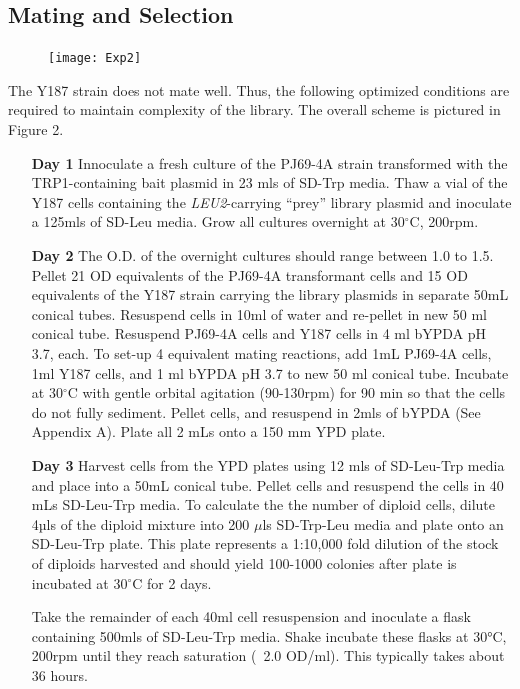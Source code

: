 \documentclass[11pt,fleqn]{book} %
\begin{document}
\subsection{Mating and Selection}

\begin{figure}[!ht]
    \centering
    \texttt{[image: Exp2]}
    \caption{}
    \label{fig:exp_fig2}
\end{figure}

The Y187 strain does not mate well.  Thus, the following optimized conditions are required to maintain complexity of the library.  The overall scheme is pictured in Figure 2.
\vspace{0.1in}
\begin{enumerate}[leftmargin=0.8in]
    \item[\textbf{Day 1}] Innoculate a fresh culture of the PJ69-4A strain transformed with the TRP1-containing bait plasmid in 23 mls of SD-Trp media. Thaw a vial of the Y187 cells containing the \emph{LEU2}-carrying “prey” library plasmid and inoculate a 125mls of SD-Leu media. Grow all cultures overnight at 30$^\circ$C, 200rpm.
    \item[\textbf{Day 2}] The O.D. of the overnight cultures should range between 1.0 to 1.5.  Pellet 21 OD equivalents of the PJ69-4A transformant cells and 15 OD equivalents of the Y187 strain carrying the library plasmids in separate 50mL conical tubes. Resuspend cells in 10ml of water and re-pellet in new 50 ml conical tube.  Resuspend PJ69-4A cells and Y187 cells in 4 ml bYPDA pH 3.7, each. To set-up 4 equivalent mating reactions, add 1mL PJ69-4A cells, 1ml Y187 cells, and 1 ml bYPDA pH 3.7 to new 50 ml conical tube. Incubate at 30$^\circ$C with gentle orbital agitation (90-130rpm) for 90 min so that the cells do not fully sediment.  Pellet cells, and resuspend in 2mls of bYPDA (See Appendix A). Plate all 2 mLs onto a 150 mm YPD plate.  
    \item[\textbf{Day 3}] Harvest cells from the YPD plates using 12 mls of SD-Leu-Trp media and place into a 50mL conical tube.  Pellet cells and resuspend the cells in 40 mLs SD-Leu-Trp media. To calculate the the number of diploid cells, dilute 4µls of the diploid mixture into 200 $\mu$ls SD-Trp-Leu media and plate onto an SD-Leu-Trp plate.  This plate represents a 1:10,000 fold dilution of the stock of diploids harvested and should yield 100-1000 colonies after plate is incubated at 30$^\circ$C for 2 days. 
    
    Take the remainder of each 40ml cell resuspension and inoculate a flask containing 500mls of SD-Leu-Trp media. Shake incubate these flasks at 30°C, 200rpm until they reach saturation (~2.0 OD/ml).  This typically takes about 36 hours.  
\end{enumerate}
\end{document}
